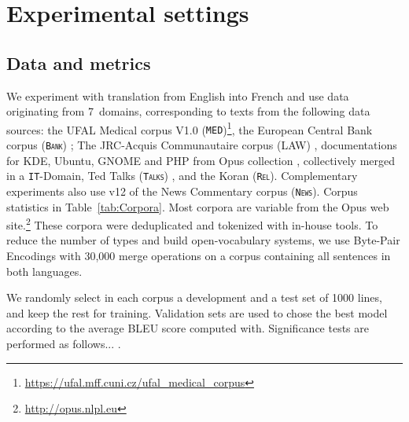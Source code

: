 \documentclass[11pt]{article}
\newcommand{\fyTodo}[1]{\Todo[FY:]{\textcolor{orange}{#1}}}
\newcommand{\domain}[1]{\texttt{\textsc{#1}}}
\begin{document}
\section{Experimental settings \label{sec:experiments}}

\subsection{Data and metrics \label{ssec:corpora}}

We experiment with translation from English into French and use data originating from 7~domains, corresponding to texts from the following data sources: the UFAL Medical corpus V1.0 (\domain{MED})\footnote{\url{https://ufal.mff.cuni.cz/ufal_medical_corpus}}, the European Central Bank corpus (\domain{Bank}) \cite{Tiedemann12parallel}; The JRC-Acquis Communautaire corpus (LAW) \cite{Steinberger06acquis}, documentations for KDE, Ubuntu, GNOME and PHP from Opus collection \cite{Tiedemann09news}, collectively merged in a \domain{IT}-Domain, Ted Talks (\domain{Talks}) \cite{Cettolo12wit}, and the Koran (\domain{Rel}). Complementary experiments also use v12 of the News Commentary corpus (\domain{News}). Corpus statistics in Table~\ref{tab:Corpora}.  Most corpora are variable from the Opus web site.\footnote{\url{http://opus.nlpl.eu}} These corpora were deduplicated and tokenized with in-house tools. To reduce the number of types and build open-vocabulary systems, we use Byte-Pair Encodings \cite{Sennrich16BPE} with 30,000 merge operations on a corpus containing all sentences in both languages.%

We randomly select in each corpus a development and a test set of 1000 lines, and keep the rest for training.  Validation sets are used to chose the best model according to the average BLEU score computed with\fyTodo{??}. Significance tests are performed as follows... \fyTodo{Fix this}.

\end{document}
